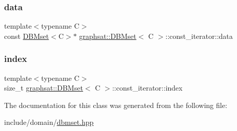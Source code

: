 \subsubsection{\texorpdfstring{data}{data}}
{\footnotesize\ttfamily template$<$typename C$>$ \\
const \mbox{\hyperlink{classgraphsat_1_1_d_b_mset}{D\+B\+Mset}}$<$C$>$$\ast$ \mbox{\hyperlink{classgraphsat_1_1_d_b_mset}{graphsat\+::\+D\+B\+Mset}}$<$ C $>$\+::const\+\_\+iterator\+::data\hspace{0.3cm}{\ttfamily [protected]}}

\mbox{\label{classgraphsat_1_1_d_b_mset_1_1const__iterator_a49e5420ca3eb37b0e27bb0be57338051}} 
\subsubsection{\texorpdfstring{index}{index}}
{\footnotesize\ttfamily template$<$typename C$>$ \\
size\+\_\+t \mbox{\hyperlink{classgraphsat_1_1_d_b_mset}{graphsat\+::\+D\+B\+Mset}}$<$ C $>$\+::const\+\_\+iterator\+::index\hspace{0.3cm}{\ttfamily [protected]}}



The documentation for this class was generated from the following file\+:\begin{DoxyCompactItemize}
\item 
include/domain/\mbox{\hyperlink{dbmset_8hpp}{dbmset.\+hpp}}\end{DoxyCompactItemize}

